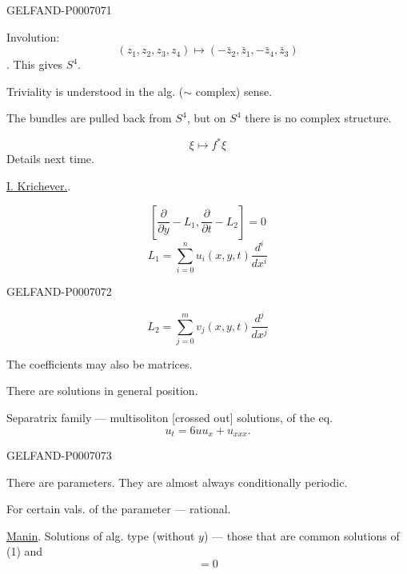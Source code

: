 \begin{GelfandAdjacentEvidence}{GELFAND-P000707}{1}

Involution:
\[
(z_1,z_2,z_3,z_4)\mapsto(-\bar z_2,\bar z_1,-\bar z_4,\bar z_3)
\]
.
This gives \(S^4\).

Triviality is understood in the alg. (\(\sim\) complex) sense.

The bundles are pulled back from \(S^4\), but on \(S^4\) there is no complex structure.

\[
\xi\mapsto f^*\xi
\]
Details next time.

\underline{I. Krichever.}\qquad {}.

\begin{equation}
\left[\frac{\partial}{\partial y}-L_1,\frac{\partial}{\partial t}-L_2\right]=0
\tag{1}
\end{equation}
\begin{equation}
L_1=\sum_{i=0}^n u_i(x,y,t)\frac{d^i}{dx^i}
\tag{2}
\end{equation}
\end{GelfandAdjacentEvidence}
\begin{GelfandAdjacentEvidence}{GELFAND-P000707}{2}

\begin{equation}
L_2=\sum_{j=0}^m v_j(x,y,t)\frac{d^j}{dx^j}
\tag{3}
\end{equation}

The coefficients may also be matrices.

There are solutions in general position.

Separatrix family --- multisoliton [crossed out] solutions, of the eq.
\[
u_t=6uu_x+u_{xxx}.
\]
\end{GelfandAdjacentEvidence}
\begin{GelfandAdjacentEvidence}{GELFAND-P000707}{3}


There are parameters. They are almost always conditionally periodic.

For certain vals. of the parameter --- rational.

\underline{Manin}. Solutions of alg. type (without \(y\)) --- those that are common solutions of (1) and
\begin{equation}
[L_1,L_3]=0
\tag{4}
\end{equation}
\end{GelfandAdjacentEvidence}
